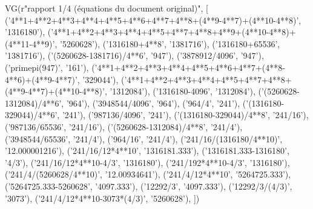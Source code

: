 \documentclass[11pt,a4paper]{article}
\begin{document}
\begin{pycode}
VG(r"rapport 1/4 (équations du document original)", [
  ('4**1+4**2+4**3+4**4+4**5+4**6+4**7+4**8+(4**9-4**7)+(4**10-4**8)', '1316180'),
  ('4**1+4**2+4**3+4**4+4**5+4**7+4**8+4**9+(4**10-4**8)+(4**11-4**9)', '5260628'),
  ('1316180+4**8', '1381716'),
  ('1316180+65536', '1381716'),
  ('(5260628-1381716)/4**6', '947'),
  ('3878912/4096', '947'),
  ('primepi(947)', '161'),
  ('4**1+4**2+4**3+4**4+4**5+4**6+4**7+(4**8-4**6)+(4**9-4**7)', '329044'),
  ('4**1+4**2+4**3+4**4+4**5+4**7+4**8+(4**9-4**7)+(4**10-4**8)', '1312084'),
  ('1316180-4096', '1312084'),
  ('(5260628-1312084)/4**6', '964'),
  ('3948544/4096', '964'),
  ('964/4', '241'),
  ('(1316180-329044)/4**6', '241'),
  ('987136/4096', '241'),
  ('(1316180-329044)/4**8', '241/16'),
  ('987136/65536', '241/16'),
  ('(5260628-1312084)/4**8', '241/4'),
  ('3948544/65536', '241/4'),
  ('964/16', '241/4'),
  ('241/16/(1316180/4**10)', '12.000001216'),
  ('241/16/12*4**10', '1316181.333'),
  ('1316181.333-1316180', '4/3'),
  ('241/16/12*4**10-4/3', '1316180'),
  ('241/192*4**10-4/3', '1316180'),
  ('241/4/(5260628/4**10)', '12.00934641'),
  ('241/4/12*4**10', '5264725.333'),
  ('5264725.333-5260628', '4097.333'),
  ('12292/3', '4097.333'),
  ('12292/3/(4/3)', '3073'),
  ('241/4/12*4**10-3073*(4/3)', '5260628'),
])
\end{pycode}
\end{document}
